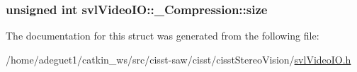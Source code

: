 \hypertarget{structsvl_video_i_o_1_1___compression_a82d6debeaf90fa62810321f750db7698}{
\subsubsection[{size}]{\setlength{\rightskip}{0pt plus 5cm}unsigned int svl\-Video\-I\-O\-::\-\_\-\-Compression\-::size}}\label{structsvl_video_i_o_1_1___compression_a82d6debeaf90fa62810321f750db7698}


The documentation for this struct was generated from the following file\-:\begin{DoxyCompactItemize}
\item 
/home/adeguet1/catkin\-\_\-ws/src/cisst-\/saw/cisst/cisst\-Stereo\-Vision/\hyperlink{svl_video_i_o_8h}{svl\-Video\-I\-O.\-h}\end{DoxyCompactItemize}
